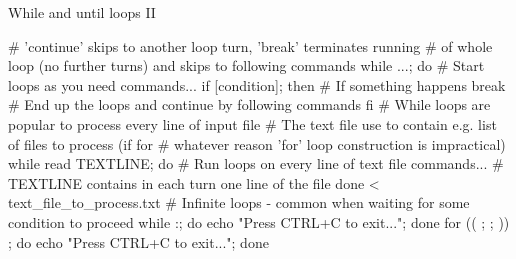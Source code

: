 \documentclass[compress, ucs, xelatex, 11pt, xcolor=svgnames, aspectratio=169,
	hyperref={
		bookmarks=true,
		unicode=true,
		colorlinks=true,
		pdftitle={Linux, command line and MetaCentrum},
		plainpages=false,
		pdfauthor={Vojtech Zeisek},
		pdfsubject={Course about use of Linux command line, writing shell scripts and using MetaCentrum of CESNET},
		pdfcreator={XeLaTeX},
		pdfkeywords={Linux, GNU, BASH, shell, command line, MetaCentrum},
		linkcolor=DarkRed, %
		anchorcolor=DarkBlue, %
		citecolor=Indigo, %
		filecolor=NavyBlue, %
		menucolor=DarkMagenta, %
		urlcolor=DarkBlue, %
		pdftex},
	url={hyphens, lowtilde} %
	]{beamer}
\begin{document}
\begin{frame}[fragile]{While and until loops II}
	\begin{bashcode}
    # 'continue' skips to another loop turn, 'break' terminates running
    # of whole loop (no further turns) and skips to following commands
    while ...; do # Start loops as you need
      commands...
      if [condition]; then # If something happens
        break # End up the loops and continue by following commands
        fi
    # While loops are popular to process every line of input file
    # The text file use to contain e.g. list of files to process (if for
    # whatever reason 'for' loop construction is impractical)
    while read TEXTLINE; do # Run loops on every line of text file
      commands... # TEXTLINE contains in each turn one line of the file
      done < text_file_to_process.txt
    # Infinite loops - common when waiting for some condition to proceed
    while :; do echo "Press CTRL+C to exit..."; done
    for (( ; ; )) ; do echo "Press CTRL+C to exit..."; done
	\end{bashcode}
\end{frame}

\subsection{}
\end{document}
